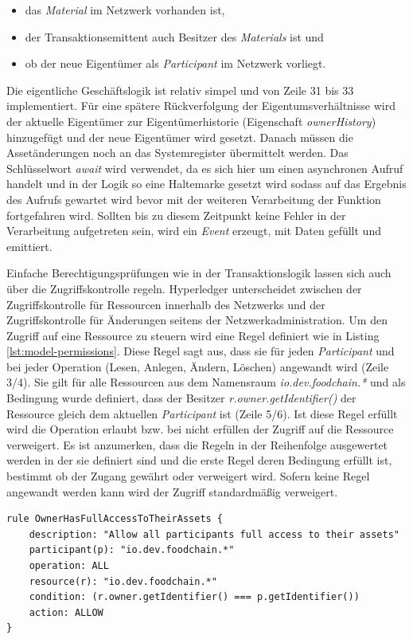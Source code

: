 \begin{itemize}
    \item das \textit{Material} im Netzwerk vorhanden ist,
    \item der Transaktionsemittent auch Besitzer des \textit{Materials} ist und
    \item ob der neue Eigentümer als \textit{Participant} im Netzwerk vorliegt.
\end{itemize}

Die eigentliche Geschäftslogik ist relativ simpel und von Zeile 31 bis 33 implementiert. Für eine spätere Rückverfolgung der Eigentumsverhältnisse wird der aktuelle Eigentümer zur Eigentümerhistorie (Eigenschaft \textit{ownerHistory}) hinzugefügt und der neue Eigentümer wird gesetzt. Danach müssen die Assetänderungen noch an das Systemregister übermittelt werden. Das Schlüsselwort \textit{await} wird verwendet, da es sich hier um einen asynchronen Aufruf handelt und in der Logik so eine Haltemarke gesetzt wird sodass auf das Ergebnis des Aufrufs gewartet wird bevor mit der weiteren Verarbeitung der Funktion fortgefahren wird. Sollten bis zu diesem Zeitpunkt keine Fehler in der Verarbeitung aufgetreten sein, wird ein \textit{Event} erzeugt, mit Daten gefüllt und emittiert.

Einfache Berechtigungsprüfungen wie in der Transaktionslogik lassen sich auch über die Zugriffskontrolle regeln. Hyperledger unterscheidet zwischen der Zugriffskontrolle für Ressourcen innerhalb des Netzwerks und der Zugriffskontrolle für Änderungen seitens der Netzwerkadministration. Um den Zugriff auf eine Ressource zu steuern wird eine Regel definiert wie in Listing \ref{lst:model-permissions}. Diese Regel sagt aus, dass sie für jeden \textit{Participant} und bei jeder Operation (Lesen, Anlegen, Ändern, Löschen) angewandt wird (Zeile 3/4). Sie gilt für alle Ressourcen aus dem Namensraum \textit{io.dev.foodchain.*} und als Bedingung wurde definiert, dass der Besitzer \textit{r.owner.getIdentifier()} der Ressource gleich dem aktuellen \textit{Participant} ist (Zeile 5/6). Ist diese Regel erfüllt wird die Operation erlaubt bzw. bei nicht erfüllen der Zugriff auf die Ressource verweigert. Es ist anzumerken, dass die Regeln in der Reihenfolge ausgewertet werden in der sie definiert sind und die erste Regel deren Bedingung erfüllt ist, bestimmt ob der Zugang gewährt oder verweigert wird. Sofern keine Regel angewandt werden kann wird der Zugriff standardmäßig verweigert.

\begin{lstlisting}[caption={Berechtigungsdefinition},label=lst:model-permissions]
rule OwnerHasFullAccessToTheirAssets {
    description: "Allow all participants full access to their assets"
    participant(p): "io.dev.foodchain.*"
    operation: ALL
    resource(r): "io.dev.foodchain.*"
    condition: (r.owner.getIdentifier() === p.getIdentifier())
    action: ALLOW
}
\end{lstlisting}

